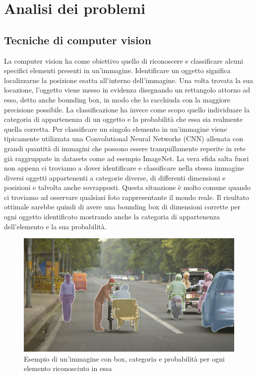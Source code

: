 \section{Analisi dei problemi}
\subsection{Tecniche di computer vision}
La computer vision ha come obiettivo quello di riconoscere e classificare alcuni specifici elementi presenti in un'immagine. Identificare un oggetto significa localizzarne la posizione esatta all'interno dell'immagine. Una volta trovata la sua locazione, l'oggetto viene messo in evidenza disegnando un rettangolo attorno ad esso, detto anche bounding box, in modo che lo racchiuda con la maggiore precisione possibile. La classificazione ha invece come scopo quello individuare la categoria di appartenenza di un oggetto e la probabilità che essa sia realmente quella corretta.
Per classificare un singolo elemento in un'immagine viene tipicamente utilizzata una Convolutional Neural Networks (CNN) allenata con grandi quantità di immagini che possono essere tranquillamente reperite in rete già raggruppate in datasets come ad esempio ImageNet.
La vera sfida salta fuori non appena ci troviamo a dover identificare e classificare nella stessa immagine diversi oggetti appartenenti a categorie diverse, di differenti dimensioni e posizioni e talvolta anche sovrapposti. Questa situazione è molto comune quando ci troviamo ad osservare qualsiasi foto rappresentante il mondo reale. Il risultato ottimale sarebbe quindi di avere una bounding box di dimensioni corrette per ogni oggetto identificato mostrando anche la categoria di appartenenza dell'elemento e la sua probabilità.
\begin{figure}[H]
	\centering
	\includegraphics[width=0.7\linewidth]{images/Esempio-computer-vision.jpg}
	\caption{Esempio di un'immagine con box, categoria e probabilità per ogni elemento riconosciuto in essa}
	\label{Esempio di un frame di un video in 4K}
\end{figure}
